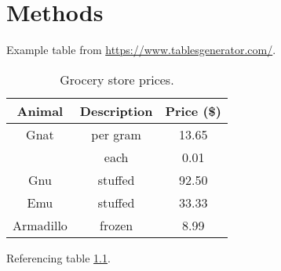 \setcounter{chapter}{2}
\chapter{Methods}

Example table from \href{https://www.tablesgenerator.com/#}{https://www.tablesgenerator.com/}.
\begin{table}[]
    \centering
    \begin{tabular}{ccc}
    \hline
    Animal     & Description & Price (\$) \\ \hline
    Gnat       & per gram    & 13.65      \\
               & each        & 0.01       \\
    Gnu        & stuffed     & 92.50      \\
    Emu        & stuffed     & 33.33      \\
    Armadillo  & frozen      & 8.99       \\ \hline
    \end{tabular}
    \caption{Grocery store prices. }
    \label{tab:gros}
\end{table}

Referencing table \ref{tab:gros}.